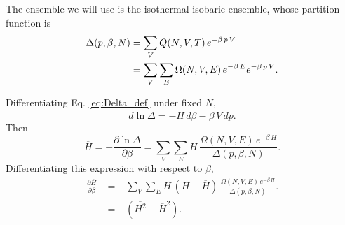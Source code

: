 \documentclass[twocolumn, 10pt]{article}
\numberwithin{equation}{section}
\newenvironment{solution}[1][\empty]
{\par\medskip
  \textbf{\ifx\empty#1{Solution.}\relax\else{#1}\fi} \ignorespaces}
{\medskip}
\begin{document}
\begin{solution}
  The ensemble we will use is the isothermal-isobaric ensemble,
  whose partition function is
  \begin{align}
    \Delta(p, \beta, N)
    &=
    \sum_V Q(N, V, T) \, e^{-\beta \, p \, V}
    \notag
    \\
    &=
    \sum_V \sum_E \Omega(N, V, E) \,
    e^{-\beta \, E } e^{-\beta \, p \, V}
    .
    \label{eq:Delta_def}
  \end{align}

  Differentiating Eq. \eqref{eq:Delta_def}
  under fixed $N$,
  \begin{equation}
    d\ln\Delta
    =
    -\overline{H} \, d\beta
    -\beta \, \overline{V} \, dp.
    \label{eq:firstlawlnDelta}
  \end{equation}
  Then
  $$
  \overline H
  =
  -\frac{ \partial \ln \Delta } { \partial \beta }
  =
  \sum_{V}\sum_{E} H \,
  \frac{ \Omega(N, V, E) \, e^{-\beta \, H} } { \Delta(p, \beta, N) }.
  $$
  Differentiating this expression with respect to $\beta$,
  \begin{align*}
  \frac{ \partial \overline H } { \partial \beta }
  &=
  -\sum_{V}\sum_{E} H \, (H - \overline H) \,
  \frac{ \Omega(N, V, E) \, e^{-\beta \, H} } { \Delta(p, \beta, N) }.
  \\
  &=
  -\left(
  \overline{ H^2 } - \overline H^2 \right).
  \end{align*}


\end{solution}
\end{document}
